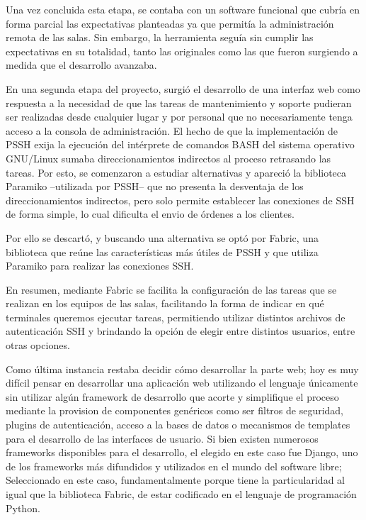 \documentclass[runningheads,a4paper,titlepage]{llncs}
\begin{document}
Una vez concluida esta etapa, se contaba con un software funcional que
cubría en forma parcial las expectativas planteadas ya que permitía la 
administración remota de las salas. Sin embargo, la herramienta seguía sin 
cumplir las expectativas en su totalidad, tanto las originales como las que
fueron surgiendo a medida que el desarrollo avanzaba.

En una segunda etapa del proyecto, surgió el desarrollo de una interfaz web 
como respuesta a la necesidad de que las tareas de mantenimiento y  
soporte pudieran ser realizadas desde cualquier lugar y por personal que no necesariamente tenga acceso a
la consola de administración. El hecho de que la implementaci\'on de PSSH exija la
ejecuci\'on del int\'erprete de comandos BASH del sistema operativo GNU/Linux
sumaba direccionamientos indirectos al proceso retrasando las tareas.  Por esto, se
comenzaron a estudiar alternativas y apareció la biblioteca
Paramiko\cite{paramiko} --utilizada por PSSH-- que no presenta la desventaja de
los direccionamientos indirectos, pero solo permite establecer las conexiones de
SSH de forma simple, lo cual dificulta el envio de órdenes a los clientes.

Por ello se descartó, y buscando una alternativa se optó por Fabric\cite{fabric},
una biblioteca que re\'une las características más útiles de PSSH y que utiliza Paramiko
para realizar las conexiones SSH.

En resumen, mediante Fabric se facilita la configuración de las tareas que se realizan en los equipos de las salas, facilitando la forma de indicar  en qu\'e terminales queremos ejecutar tareas, permitiendo utilizar
distintos archivos de autenticaci\'on SSH y brindando la opci\'on de elegir entre
distintos usuarios, entre otras opciones.

Como última instancia restaba decidir cómo desarrollar la parte web; hoy es muy
difícil pensar en desarrollar una aplicación web utilizando el lenguaje
únicamente sin utilizar algún framework de desarrollo que acorte y simplifique
el proceso mediante la provision de componentes
genéricos como ser filtros de seguridad, plugins de autenticación, acceso a
la bases de datos o mecanismos de templates para el desarrollo de las interfaces
de usuario. Si bien existen numerosos frameworks disponibles para el desarrollo,
el elegido en este caso fue Django\cite{django}, uno de los frameworks más
difundidos y utilizados en el mundo del software libre; Seleccionado en este caso, 
fundamentalmente porque tiene la particularidad al igual que la biblioteca Fabric, de estar codificado en el
lenguaje de programaci\'on Python\cite{python}.
\end{document}
